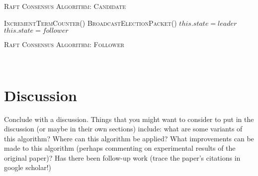\documentclass[11pt]{article}
\begin{document}
\begin{algorithm}[H]\caption{\textsc{Raft Consensus Algorithm: Candidate}}
 \begin{algorithmic}[1]
 \State \textsc{IncrementTermCounter()} 
 \State \textsc{BroadcastElectionPacket()} 
  {}
	\State $this.state = leader $ 
 \EndFunction{\newline}
  {}
 	\State $this.state = follower $ 
 \EndFunction
\end{algorithmic}
\end{algorithm}

\begin{algorithm}[H]\caption{\textsc{Raft Consensus Algorithm: Follower}}
 \begin{algorithmic}[1]
  
 	  
 \EndFunction{}
   
 	 
 	 
 \EndFunction {}
  {}
	 
 \EndFunction\
\end{algorithmic}
\end{algorithm}

\section{Discussion}
Conclude with a discussion.  Things that you might want to consider to put in 
the discussion (or maybe in their own sections) include: what are some variants 
of this algorithm? Where can this algorithm be applied?  What improvements can 
be made to this algorithm (perhaps commenting on experimental results of the 
original paper)?  Has there been follow-up work (trace the paper's citations in 
google scholar!)
\end{document}
